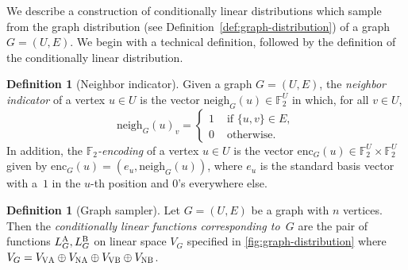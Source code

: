 \documentclass[11pt]{article}
\theoremstyle{definition}
\newtheorem{definition}[theorem]{Definition}
\newcommand{\F}{\ensuremath{\mathbb{F}}}
\newcommand{\labelstyle}[1]{\ensuremath{\textsc{#1}}\xspace}
\newcommand{\vertex}[1]{\labelstyle{V#1}}
\newcommand{\edge}[1]{\labelstyle{N#1}}
\newcommand{\alice}{\labelstyle{A}}
\newcommand{\bob}{\labelstyle{B}}
\begin{document}
We describe a construction of conditionally linear distributions which sample
from the graph distribution (see Definition~\ref{def:graph-distribution}) of a
graph $G = (U, E)$.
We begin with a technical definition, followed by the definition of the
conditionally linear distribution.

\begin{definition}[Neighbor indicator]\label{def:type-neighbor}
  Given a graph $G = (U, E)$, the \emph{neighbor indicator} of a vertex $u \in
  U$ is the vector $\mathrm{neigh}_G(u) \in \F_2^U$ in which, for all $v \in U$,
  \begin{equation*}
    \mathrm{neigh}_G(u)_v =
    \begin{cases}
      1 & \text{ if } \{u, v\} \in E,\\
      0 & \text{ otherwise}.
    \end{cases}
  \end{equation*}
  In addition, the \emph{$\F_2$-encoding} of a vertex $u \in U$ is the vector
  $\mathrm{enc}_G(u) \in \F_2^U \times \F_2^U$ given by $\mathrm{enc}_G(u) =
  (e_u, \mathrm{neigh}_G(u))$, where $e_u$ is the standard basis vector with
  a~$1$ in the $u$-th position and $0$'s everywhere else.
\end{definition}

\begin{definition}[Graph sampler]\label{def:graph-sampler}
  Let $G = (U, E)$ be a graph with $n$ vertices.
  Then the \emph{conditionally linear functions corresponding to~$G$} are the
  pair of functions $L_G^\alice, L_G^\bob$ on linear space $V_G$ specified in
  \cref{fig:graph-distribution} where $V_G = V_{\vertex{\alice}} \oplus
  V_{\edge{\alice}} \oplus V_{\vertex{\bob}} \oplus V_{\edge{\bob}}$.
\end{definition}
\end{document}
